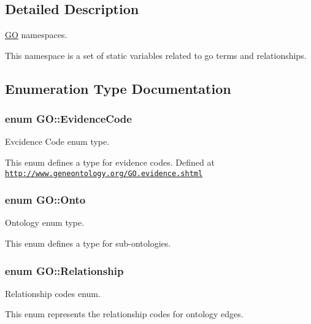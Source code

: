 \subsection{Detailed Description}
\hyperlink{namespaceGO}{GO} namespaces. 

This namespace is a set of static variables related to go terms and relationships. 

\subsection{Enumeration Type Documentation}
\subsubsection[{\texorpdfstring{Evidence\+Code}{EvidenceCode}}]{\setlength{\rightskip}{0pt plus 5cm}enum {\bf G\+O\+::\+Evidence\+Code}}\hypertarget{namespaceGO_a4ce5387bbcdaec3648957c7903f2caf3}{}\label{namespaceGO_a4ce5387bbcdaec3648957c7903f2caf3}


Evcidence Code enum type. 

This enum defines a type for evidence codes. Defined at \href{http://www.geneontology.org/GO.evidence.shtml}{\tt http\+://www.\+geneontology.\+org/\+G\+O.\+evidence.\+shtml} 
\subsubsection[{\texorpdfstring{Onto}{Onto}}]{\setlength{\rightskip}{0pt plus 5cm}enum {\bf G\+O\+::\+Onto}}\hypertarget{namespaceGO_a5ae335887b5cf40a9ef3045be9247fc3}{}\label{namespaceGO_a5ae335887b5cf40a9ef3045be9247fc3}


Ontology enum type. 

This enum defines a type for sub-\/ontologies. 
\subsubsection[{\texorpdfstring{Relationship}{Relationship}}]{\setlength{\rightskip}{0pt plus 5cm}enum {\bf G\+O\+::\+Relationship}}\hypertarget{namespaceGO_aaa3905b2e000a8be411da8038827f993}{}\label{namespaceGO_aaa3905b2e000a8be411da8038827f993}


Relationship codes enum. 

This enum represents the relationship codes for ontology edges. 


